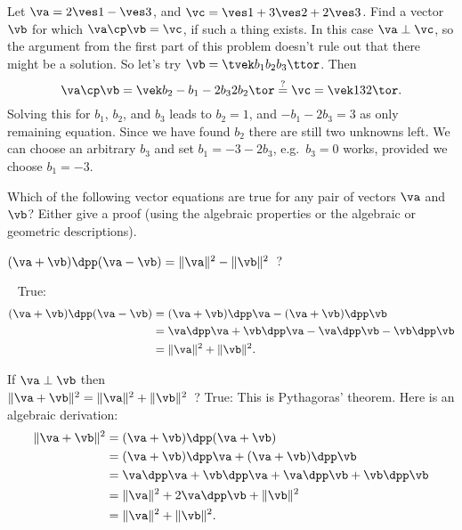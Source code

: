 \begin{multicols}{2}
\subprob Let $\va = 2\ves1-\ves3$, and $\vc = \ves1+3\ves2+2\ves3$.%
Find a vector $\vb$ for which $\va\cp\vb=\vc$, if such a thing exists. %
\answer
In this case $\va\perp\vc$, so the argument from the first part of this problem
doesn't rule out that there might be a solution.  So let's try $\vb =
\tvek b_1\\b_2\\b_3\ttor$.  Then
\[
  \va\cp\vb
  = \vek b_2 \\ -b_1-2b_3 \\ 2b_2\tor \stackrel?= \vc
  = \vek 1\\3\\2\tor.
\]
Solving this for $b_1$, $b_2$, and $b_3$ leads to $b_2=1$, and $-b_1-2b_3=3$ as
only remaining equation.  Since we have found $b_2$ there are still two unknowns
left.  We can choose an arbitrary $b_3$ and set $b_1 = -3-2b_3$, e.g.~$b_3=0$
works, provided we choose $b_1 = -3$.
\endanswer

\problem Which of the following vector equations are true for any pair %
of vectors $\va$ and $\vb$?  Either give a proof (using the algebraic
properties or the algebraic or geometric descriptions).

\subprob $(\va+\vb)\dpp(\va-\vb) = \|\va\|^2 - \|\vb\|^2$~?

~\hfill%
\answer%
True:
\begin{align*}
  (\va+\vb)\dpp(\va-\vb) &=(\va+\vb) \dpp \va  - (\va+\vb) \dpp\vb\\
  &= \va \dpp \va +\vb \dpp \va  - \va \dpp\vb - \vb \dpp\vb\\
  &= \|\va\|^2 + \| \vb \|^2.
\end{align*}
\endanswer

\subprob  If  $\va\perp\vb$ then\\[1ex]
\null\quad$\|\va+\vb\|^2 = \|\va\|^2 + \|\vb\|^2$~?%
\answer%
True:  This is Pythagoras' theorem.  Here is an algebraic derivation:
\begin{align*}
  \|\va+\vb\|^2 &= (\va+\vb) \dpp (\va+\vb)\\
  &= (\va+\vb) \dpp \va  + (\va+\vb) \dpp\vb\\
  &= \va \dpp \va +\vb \dpp \va  + \va \dpp\vb + \vb \dpp\vb\\
  &= \|\va\|^2 + 2 \va \dpp\vb + \| \vb \|^2\\
  &= \|\va\|^2 + \| \vb \|^2.
\end{align*}
\endanswer


\end{multicols}
